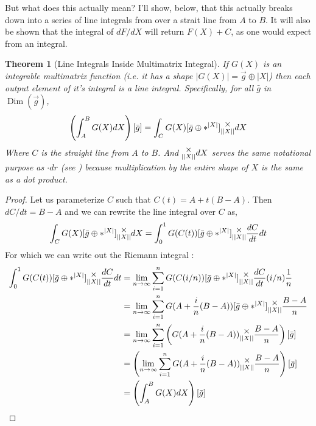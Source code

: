 \documentclass[12pt]{book}
\theoremstyle{plain}
\newtheorem{theorem}{Theorem}[chapter]
\theoremstyle{definition}
\theoremstyle{ppart}
\theoremstyle{case}
\theoremstyle{solution}
\DeclareMathOperator{\Dim}{Dim}
\newcommand{\mmult}[1]{\text{\raisebox{1ex}{$\underset{#1}{\times}$}}}
\newcommand{\shape}[1]{\left|#1\right|}
\begin{document}
\begin{landscape}
But what does this actually mean? I'll show, below, that this actually breaks down into
a series of line integrals from over a strait line from $A$ to $B$. It will also be
shown that the integral of $dF/dX$ will return $F(X) + C$, as one would expect from an
integral.

\begin{theorem}[Line Integrals Inside Multimatrix Integral]
\label{line_inside}
If $G(X)$ is an integrable multimatrix function (i.e. it has a shape
$\shape{G(X)} = \vec{g} \oplus \shape{X}$) then each output element of it's
integral is a line integral.
Specifically, for all $\bar{g}$ in $\Dim(\vec{g})$,
\[ \left(\int_A^B G(X) dX\right)[\bar{g}] = \int_C G(X)[\bar{g} \oplus *^{\shape{X}}] \mmult{\shape{\shape{X}}} dX \]
Where $C$ is the straight line from $A$ to $B$. And $\mmult{\shape{\shape{X}}} dX$ serves the same notational purpose as
$\cdot dr$ (see \cite{wiki:line_int}) because multiplication by the entire shape of $X$ is the same as a dot product.
\end{theorem}
\begin{proof}
Let us parameterize $C$ such that $C(t) = A + t(B-A)$. Then $dC/dt = B-A$ and
we can rewrite the line integral over $C$ as,
\[ \int_C G(X)[\bar{g} \oplus *^{\shape{X}}] \mmult{\shape{\shape{X}}} dX = \int_0^1 G(C(t))[\bar{g} \oplus *^{\shape{X}}] \mmult{\shape{\shape{X}}} \frac{dC}{dt} dt \]
For which we can write out the Riemann integral \cite{wiki:riemann_int}:
\begin{align*}
  \int_0^1 G(C(t))[\bar{g} \oplus *^{\shape{X}}] \mmult{\shape{\shape{X}}} \frac{dC}{dt} dt
  &=
  \lim_{n \to \infty} \sum_{i=1}^n G(C(i/n))[\bar{g} \oplus *^{\shape{X}}] \mmult{\shape{\shape{X}}} \frac{dC}{dt}(i/n) \frac{1}{n} \\
  &=
  \lim_{n \to \infty} \sum_{i=1}^n G(A + \frac{i}{n}(B-A))[\bar{g} \oplus *^{\shape{X}}] \mmult{\shape{\shape{X}}} \frac{B-A}{n} \\
  &=
  \lim_{n \to \infty} \sum_{i=1}^n \left( G(A + \frac{i}{n}(B-A)) \mmult{\shape{\shape{X}}} \frac{B-A}{n} \right)[\bar{g}] \\
  &=
  \left( \lim_{n \to \infty} \sum_{i=1}^n G(A + \frac{i}{n}(B-A)) \mmult{\shape{\shape{X}}} \frac{B-A}{n} \right)[\bar{g}] \\
  &=
  \left(\int_A^B G(X) dX\right)[\bar{g}] 
\end{align*}
\end{proof}
\end{landscape}
\end{document}
